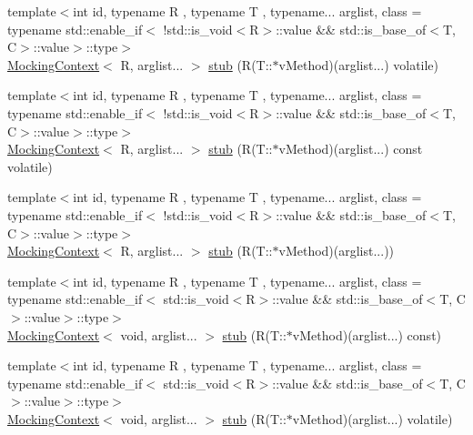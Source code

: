 \begin{DoxyCompactItemize}
\item 
{\footnotesize template$<$int id, typename R , typename T , typename... arglist, class  = typename std\+::enable\+\_\+if$<$                !std\+::is\+\_\+void$<$\+R$>$\+::value \&\& std\+::is\+\_\+base\+\_\+of$<$\+T, C$>$\+::value$>$\+::type$>$ }\\\mbox{\hyperlink{classfakeit_1_1MockingContext}{Mocking\+Context}}$<$ R, arglist... $>$ \mbox{\hyperlink{classfakeit_1_1Mock_a6974858200b57469de78bf2a06d6fa02}{stub}} (R(T\+::$\ast$v\+Method)(arglist...) volatile)
\item 
{\footnotesize template$<$int id, typename R , typename T , typename... arglist, class  = typename std\+::enable\+\_\+if$<$                !std\+::is\+\_\+void$<$\+R$>$\+::value \&\& std\+::is\+\_\+base\+\_\+of$<$\+T, C$>$\+::value$>$\+::type$>$ }\\\mbox{\hyperlink{classfakeit_1_1MockingContext}{Mocking\+Context}}$<$ R, arglist... $>$ \mbox{\hyperlink{classfakeit_1_1Mock_a963fce628ddab338bc3ee984a137db31}{stub}} (R(T\+::$\ast$v\+Method)(arglist...) const volatile)
\item 
{\footnotesize template$<$int id, typename R , typename T , typename... arglist, class  = typename std\+::enable\+\_\+if$<$                !std\+::is\+\_\+void$<$\+R$>$\+::value \&\& std\+::is\+\_\+base\+\_\+of$<$\+T, C$>$\+::value$>$\+::type$>$ }\\\mbox{\hyperlink{classfakeit_1_1MockingContext}{Mocking\+Context}}$<$ R, arglist... $>$ \mbox{\hyperlink{classfakeit_1_1Mock_a69141994a924c71af3bf9cb4d5a998b6}{stub}} (R(T\+::$\ast$v\+Method)(arglist...))
\item 
{\footnotesize template$<$int id, typename R , typename T , typename... arglist, class  = typename std\+::enable\+\_\+if$<$                std\+::is\+\_\+void$<$\+R$>$\+::value \&\& std\+::is\+\_\+base\+\_\+of$<$\+T, C$>$\+::value$>$\+::type$>$ }\\\mbox{\hyperlink{classfakeit_1_1MockingContext}{Mocking\+Context}}$<$ void, arglist... $>$ \mbox{\hyperlink{classfakeit_1_1Mock_a1861b19f93de559fc183139f1ecdfa6b}{stub}} (R(T\+::$\ast$v\+Method)(arglist...) const)
\item 
{\footnotesize template$<$int id, typename R , typename T , typename... arglist, class  = typename std\+::enable\+\_\+if$<$                std\+::is\+\_\+void$<$\+R$>$\+::value \&\& std\+::is\+\_\+base\+\_\+of$<$\+T, C$>$\+::value$>$\+::type$>$ }\\\mbox{\hyperlink{classfakeit_1_1MockingContext}{Mocking\+Context}}$<$ void, arglist... $>$ \mbox{\hyperlink{classfakeit_1_1Mock_a8bb1a9ff231e91407f6dea872e2c4a4f}{stub}} (R(T\+::$\ast$v\+Method)(arglist...) volatile)

\end{DoxyCompactItemize}
